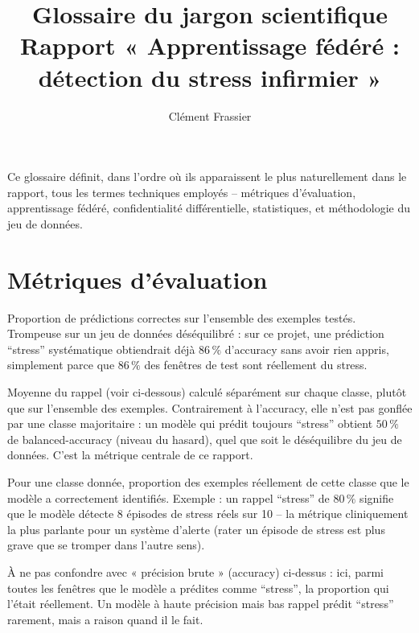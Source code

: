 \documentclass[11pt]{article}
\title{Glossaire du jargon scientifique\\\large Rapport « Apprentissage fédéré : détection du stress infirmier »}
\author{Clément Frassier}
\date{}
\begin{document}
\maketitle

\noindent Ce glossaire définit, dans l'ordre où ils apparaissent le plus naturellement
dans le rapport, tous les termes techniques employés -- métriques d'évaluation,
apprentissage fédéré, confidentialité différentielle, statistiques, et méthodologie du
jeu de données.

\section{Métriques d'évaluation}

\begin{description}[leftmargin=0em, style=nextline]

\item[Accuracy (précision brute)] Proportion de prédictions correctes sur l'ensemble
des exemples testés. Trompeuse sur un jeu de données déséquilibré : sur ce projet, une
prédiction ``stress'' systématique obtiendrait déjà $86\,\%$ d'accuracy sans avoir rien
appris, simplement parce que $86\,\%$ des fenêtres de test sont réellement du stress.

\item[Balanced-accuracy] Moyenne du rappel (voir ci-dessous) calculé séparément sur
chaque classe, plutôt que sur l'ensemble des exemples. Contrairement à l'accuracy, elle
n'est pas gonflée par une classe majoritaire : un modèle qui prédit toujours ``stress''
obtient $50\,\%$ de balanced-accuracy (niveau du hasard), quel que soit le déséquilibre
du jeu de données. C'est la métrique centrale de ce rapport.

\item[Rappel (\textit{recall})] Pour une classe donnée, proportion des exemples
réellement de cette classe que le modèle a correctement identifiés. Exemple : un rappel
``stress'' de $80\,\%$ signifie que le modèle détecte 8 épisodes de stress réels sur 10 --
la métrique cliniquement la plus parlante pour un système d'alerte (rater un épisode de
stress est plus grave que se tromper dans l'autre sens).

\item[Précision (\textit{precision}, au sens statistique)] À ne pas confondre avec
« précision brute » (accuracy) ci-dessus : ici, parmi toutes les fenêtres que le modèle a
prédites comme ``stress'', la proportion qui l'était réellement. Un modèle à haute
précision mais bas rappel prédit ``stress'' rarement, mais a raison quand il le fait.


\end{description}
\end{document}
